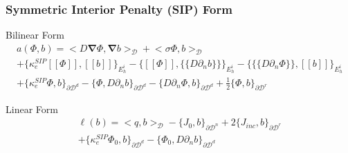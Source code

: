 \documentclass[compress,10pt]{beamer}
\renewcommand{\vec}[1]{\mathbf{#1}}
\begin{document}
\begin{frame}[t]\frametitle{Symmetric Interior Penalty (SIP) Form}
	\begin{block}{Bilinear Form}{\small
		\begin{gather*}
			 a( \Phi, b)  = \Big<  D \vec{\nabla}  \Phi , \vec{\nabla} b  \Big>_{\mathcal{D}} + \Big<  \sigma   \Phi ,  b  \Big>_{\mathcal{D}}    \\
			+  \Big\{ \kappa_e^{SIP} [\![   \Phi ]\!] , [\![  b ]\!]\Big\}_{E_h^i} - \Big\{  [\![   \Phi ]\!] , \{\!\{  D \partial_n b \}\!\}\Big\}_{E_h^i} -\Big\{ \{\!\{  D \partial_n  \Phi \}\!\} , [\![ b ]\!]\Big\}_{E_h^i} \\
			+ \Big\{ \kappa_e^{SIP}   \Phi ,   b \Big\}_{\partial \mathcal{D}^d} - \Big\{   \Phi  ,  D \partial_n b \Big\}_{\partial \mathcal{D}^d} - \Big\{   D 				\partial_n  \Phi ,   b \Big\}_{\partial \mathcal{D}^d}  +  \frac{1}{2} \Big\{    \Phi ,   b \Big\}_{\partial \mathcal{D}^r}
        	\end{gather*} }
\end{block}
\begin{block}{Linear Form}{\small
		\begin{align*}
			\ell (b) = \Big<  q, b  \Big>_{\mathcal{D}}  - \Big\{   J_{0}, b  \Big\}_{\partial \mathcal{D}^n} +  2 \Big\{   J_{inc}, b  \Big\}_{\partial 				\mathcal{D}^r} \\ + \Big\{ \kappa_e^{SIP}   \Phi_0 ,   b \Big\}_{\partial \mathcal{D}^d} - \Big\{   \Phi_0  ,  D \partial_n b \Big\}_{\partial 					\mathcal{D}^d} 
        	\end{align*} }
    \end{block}
\end{frame}
\end{document}
